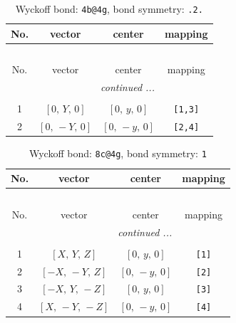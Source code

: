 \documentclass[fleqn,8pt]{jsarticle}
\begin{document}
\renewcommand{\arraystretch}{1.2}
\begin{longtable}{cccc}
\caption{Wyckoff bond: {\tt 4b@4g}, bond symmetry: {\tt .2.}}
 \\
 \hline \hline
No. & vector & center & mapping \\ \hline \endfirsthead

\multicolumn{3}{l}{\tablename\ \thetable{}} \\
 \hline \hline
No. & vector & center & mapping \\ \hline \endhead

 \hline \hline
\multicolumn{3}{r}{\footnotesize\it continued ...} \\ \endfoot

 \hline \hline
\multicolumn{3}{r}{} \\ \endlastfoot

1 & $\left[ 0,\, Y,\, 0 \right]$ & $\left[ 0,\, y,\, 0 \right]$ & {\tt [1,3]} \\ \hline
2 & $\left[ 0,\, - Y,\, 0 \right]$ & $\left[ 0,\, - y,\, 0 \right]$ & {\tt [2,4]} \\
\end{longtable}
\renewcommand{\arraystretch}{1.2}
\begin{longtable}{cccc}
\caption{Wyckoff bond: {\tt 8c@4g}, bond symmetry: {\tt 1}}
 \\
 \hline \hline
No. & vector & center & mapping \\ \hline \endfirsthead

\multicolumn{3}{l}{\tablename\ \thetable{}} \\
 \hline \hline
No. & vector & center & mapping \\ \hline \endhead

 \hline \hline
\multicolumn{3}{r}{\footnotesize\it continued ...} \\ \endfoot

 \hline \hline
\multicolumn{3}{r}{} \\ \endlastfoot

1 & $\left[ X,\, Y,\, Z \right]$ & $\left[ 0,\, y,\, 0 \right]$ & {\tt [1]} \\ \hline
2 & $\left[ - X,\, - Y,\, Z \right]$ & $\left[ 0,\, - y,\, 0 \right]$ & {\tt [2]} \\ \hline
3 & $\left[ - X,\, Y,\, - Z \right]$ & $\left[ 0,\, y,\, 0 \right]$ & {\tt [3]} \\ \hline
4 & $\left[ X,\, - Y,\, - Z \right]$ & $\left[ 0,\, - y,\, 0 \right]$ & {\tt [4]} \\
\end{longtable}
\end{document}
